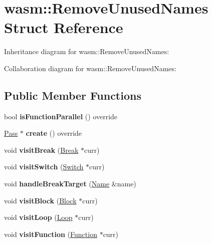 \hypertarget{structwasm_1_1_remove_unused_names}{}\section{wasm\+:\+:Remove\+Unused\+Names Struct Reference}
\label{structwasm_1_1_remove_unused_names}


Inheritance diagram for wasm\+:\+:Remove\+Unused\+Names\+:


Collaboration diagram for wasm\+:\+:Remove\+Unused\+Names\+:
\subsection*{Public Member Functions}
\begin{DoxyCompactItemize}
\item 
\mbox{\label{structwasm_1_1_remove_unused_names_a12ce757406c9af8db8bc58bd20fb590e}} 
bool {\bfseries is\+Function\+Parallel} () override
\item 
\mbox{\label{structwasm_1_1_remove_unused_names_a3cf27535018330005de9d78d7b596c90}} 
\mbox{\hyperlink{classwasm_1_1_pass}{Pass}} $\ast$ {\bfseries create} () override
\item 
\mbox{\label{structwasm_1_1_remove_unused_names_a935e9243ac8e5b09edf265dbbd1bebd4}} 
void {\bfseries visit\+Break} (\mbox{\hyperlink{classwasm_1_1_break}{Break}} $\ast$curr)
\item 
\mbox{\label{structwasm_1_1_remove_unused_names_a0cac934bc2e2bab87ee28675f769f46d}} 
void {\bfseries visit\+Switch} (\mbox{\hyperlink{classwasm_1_1_switch}{Switch}} $\ast$curr)
\item 
\mbox{\label{structwasm_1_1_remove_unused_names_a3da4bbf5618736bd5ef4f7582b57db61}} 
void {\bfseries handle\+Break\+Target} (\mbox{\hyperlink{structwasm_1_1_name}{Name}} \&name)
\item 
\mbox{\label{structwasm_1_1_remove_unused_names_ad16f141842e210343dbc3e03b6ddea4d}} 
void {\bfseries visit\+Block} (\mbox{\hyperlink{classwasm_1_1_block}{Block}} $\ast$curr)
\item 
\mbox{\label{structwasm_1_1_remove_unused_names_a468bbfae80d32c6253fe7e00a1c57e29}} 
void {\bfseries visit\+Loop} (\mbox{\hyperlink{classwasm_1_1_loop}{Loop}} $\ast$curr)
\item 
\mbox{\label{structwasm_1_1_remove_unused_names_a7dd6bae271e4239ca1c4f6249f9fb181}} 
void {\bfseries visit\+Function} (\mbox{\hyperlink{classwasm_1_1_function}{Function}} $\ast$curr)
\end{DoxyCompactItemize}
